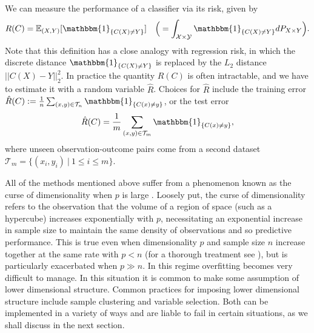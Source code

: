 \documentclass[12pt]{article}
\begin{document}
We can measure the performance of a classifier via its risk, given by 
\[R(C) = \mathbb{E}_{(X,Y)}[\mathbbm{1}_{\{C(X) \neq Y\}}] \quad \Big( = \int_{\mathcal{X}\times \mathcal{Y}} \mathbbm{1}_{\{C(X) \neq Y\}} dP_{X\times Y}\Big).\]
Note that this definition has a close analogy with regression risk, in which the discrete distance $\mathbbm{1}_{\{C(X) \neq Y \}}$ is replaced by the $L_2$ distance $||C(X)-Y||_2^2$. In practice the quantity $R(C)$ is often intractable, and we have to estimate it with a random variable $\hat{R}$. Choices for $\hat{R}$ include the training error $\hat{R}(C) := \frac{1}{n}\sum_{(x,y) \in \mathcal{T}_n} \mathbbm{1}_{\{C(x) \neq y\}}$, or the test error 
\[\hat{R}(C) = \frac{1}{m} \sum_{(x,y) \in \mathcal{T}_{m}} \mathbbm{1}_{\{C(x) \neq y\}},\] 
where unseen observation-outcome pairs come from a second dataset $\mathcal{T}_{m} = \{(x_i, y_i) \ | \ 1 \leq i \leq m \}$.

All of the methods mentioned above suffer from a phenomenon known as the curse of dimensionality when $p$ is large \citep{mai_review_2013}. Loosely put, the curse of dimensionality refers to the observation that the volume of a region of space (such as a hypercube) increases exponentially with $p$, necessitating an exponential increase in sample size to maintain the same density of observations and so predictive performance. This is true even when dimensionality $p$ and sample size $n$ increase together at the same rate with $p<n$ (for a thorough treatment see \citet{wainwright_high-dimensional_2019}), but is particularly exacerbated when $p \gg n$. In this regime overfitting becomes very difficult to manage. In this situation it is common to make some assumption of lower dimensional structure. Common practices for imposing lower dimensional structure include sample clustering and variable selection. Both can be implemented in a variety of ways and are liable to fail in certain situations, as we shall discuss in the next section.
\end{document}

